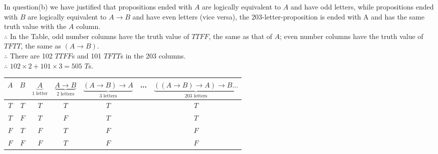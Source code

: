 \documentclass[12pt]{exam}
\begin{document}
\begin{solution}
\begin{qparts}
    \item In question(b) we have justified that propositions ended with $A$ are logically equivalent to $A$ and have odd letters, while propositions ended with $B$ are logically equivalent to $A \rightarrow B$ and have even letters (vice versa), the 203-letter-proposition is ended with A and has the same truth value with the $A$ column. 
    \\$\therefore$ In the Table, odd number columns have the truth value of $TTFF$, the same as that of $A$; even number columns have the truth value of $TFTT$, the same as $(A \rightarrow B)$.
    \\ $\therefore$ There are 102 $TTFF$s and 101 $TFTT$s in the 203 columns.
    \\$\therefore$ $102\times 2 + 101 \times 3 = 505$ $T$s.

    \begin{center}
            \begin{tabular}{c c | c | c | c | c | c}
            $A$ & $B$ & $\underbrace{A}_{1 \text{ letter}}$ & $\underbrace{A\to B}_{2 \text{ letters}}$ & $\underbrace{(A\to B) \to A}_{3 \text{ letters}}$ & ... & $\underbrace{((A\to B) \to A) \to B \dots}_{203 \text{ letters}}$ \\
            \hline
            $T$ & $T$ & $T$ & $T$ & $T$& & $T$\\
            $T$ & $F$ & $T$ & $F$ & $T$ & & $T$\\
            $F$ & $T$ & $F$ & $T$ & $F$ & & $F$\\
            $F$ & $F$ & $F$ & $T$ & $F$ & & $F$\\
            \end{tabular}
    \end{center}    
\end{qparts}
\end{solution}
\end{document}
